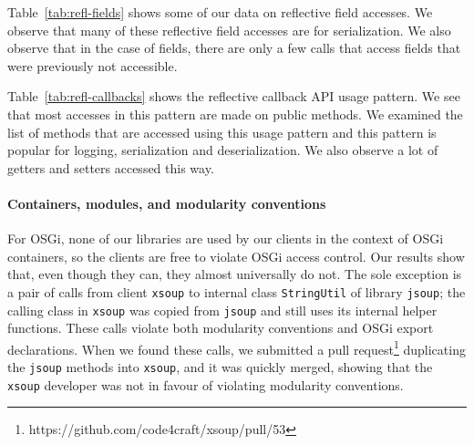 Table~\ref{tab:refl-fields} shows some of our data on reflective field accesses. We observe that many of these reflective field accesses are for serialization. We also observe that in the case of fields, there are only a few calls that access fields that were previously not accessible.
%

Table~\ref{tab:refl-callbacks} shows the reflective callback API usage pattern. We see that most accesses in this pattern are made on public methods. We examined the list of methods that are accessed using this usage pattern and this pattern is popular for logging, serialization and deserialization. We also observe a lot of getters and setters accessed this way.



%






%

\paragraph{Containers, modules, and modularity conventions}
For OSGi, none of our libraries are used by our clients in the context of OSGi containers, so the clients are free to violate OSGi access control. Our results show that, even though they can, they almost universally do not. The sole exception is a pair of calls from client \texttt{xsoup} to internal class \texttt{StringUtil} of library \texttt{jsoup}; the calling class in \texttt{xsoup} was copied from \texttt{jsoup} and still uses its internal helper functions. These calls violate both modularity conventions and OSGi export declarations. When we found these calls, we submitted a pull request\footnote{https://github.com/code4craft/xsoup/pull/53} duplicating the \texttt{jsoup} methods into \texttt{xsoup}, and it was quickly merged, showing that the \texttt{xsoup} developer was not in favour of violating modularity conventions.

